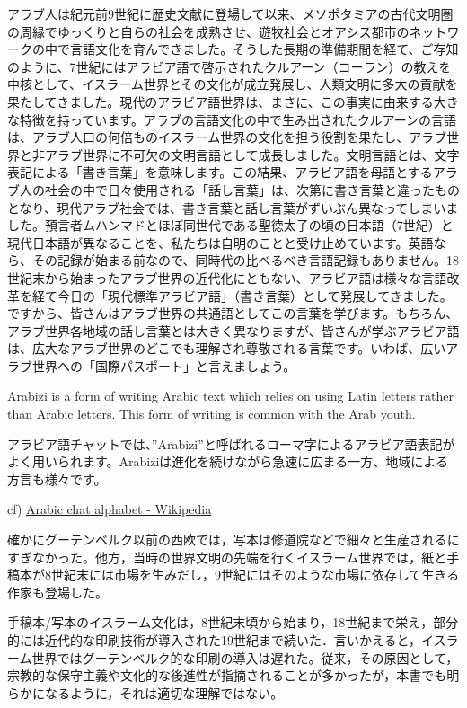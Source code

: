 アラブ人は紀元前9世紀に歴史文献に登場して以来、メソポタミアの古代文明圏の周縁でゆっくりと自らの社会を成熟させ、遊牧社会とオアシス都市のネットワークの中で言語文化を育んできました。そうした長期の準備期間を経て、ご存知のように、7世紀にはアラビア語で啓示されたクルアーン（コーラン）の教えを中核として、イスラーム世界とその文化が成立発展し、人類文明に多大の貢献を果たしてきました。現代のアラビア語世界は、まさに、この事実に由来する大きな特徴を持っています。アラブの言語文化の中で生み出されたクルアーンの言語は、アラブ人口の何倍ものイスラーム世界の文化を担う役割を果たし、アラブ世界と非アラブ世界に不可欠の文明言語として成長しました。文明言語とは、文字表記による「書き言葉」を意味します。この結果、アラビア語を母語とするアラブ人の社会の中で日々使用される「話し言葉」は、次第に書き言葉と違ったものとなり、現代アラブ社会では、書き言葉と話し言葉がずいぶん異なってしまいました。預言者ムハンマドとほぼ同世代である聖徳太子の頃の日本語（7世紀）と現代日本語が異なることを、私たちは自明のことと受け止めています。英語なら、その記録が始まる前なので、同時代の比べるべき言語記録もありません。18世紀末から始まったアラブ世界の近代化にともない、アラビア語は様々な言語改革を経て今日の「現代標準アラビア語」（書き言葉）として発展してきました。ですから、皆さんはアラブ世界の共通語としてこの言葉を学びます。もちろん、アラブ世界各地域の話し言葉とは大きく異なりますが、皆さんが学ぶアラビア語は、広大なアラブ世界のどこでも理解され尊敬される言葉です。いわば、広いアラブ世界への「国際パスポート」と言えましょう\cite{el.minoh.osaka-u.ac.jp/flc/ara/culture01.html}。

Arabizi is a form of writing Arabic text which relies on using Latin letters rather than Arabic letters. This form of writing is common with the Arab youth\cite{sentiment_analysis_for_arabizi_text}.

アラビア語チャットでは、”Arabizi”と呼ばれるローマ字によるアラビア語表記がよく用いられます。Arabiziは進化を続けながら急速に広まる一方、地域による方言も様々です\cite{www.basistech.jp/rosette-api-adds-support-for-arabizi-script/}。

cf) \href{https://en.wikipedia.org/wiki/Arabic_chat_alphabet}{Arabic chat alphabet - Wikipedia}

確かにグーテンベルク以前の西欧では，写本は修道院などで細々と生産されるにすぎなかった。他方，当時の世界文明の先端を行くイスラーム世界では，紙と手稿本が8世紀末には市場を生みだし，9世紀にはそのような市場に依存して生きる作家も登場した\cite{history_of_islamic_books}。

手稿本/写本のイスラーム文化は，8世紀末頃から始まり，18世紀まで栄え，部分的には近代的な印刷技術が導入された19世紀まで続いた．言いかえると，イスラーム世界ではグーテンベルク的な印刷の導入は遅れた。従来，その原因として，宗教的な保守主義や文化的な後進性が指摘されることが多かったが，本書でも明らかになるように，それは適切な理解ではない\cite{history_of_islamic_books}。

